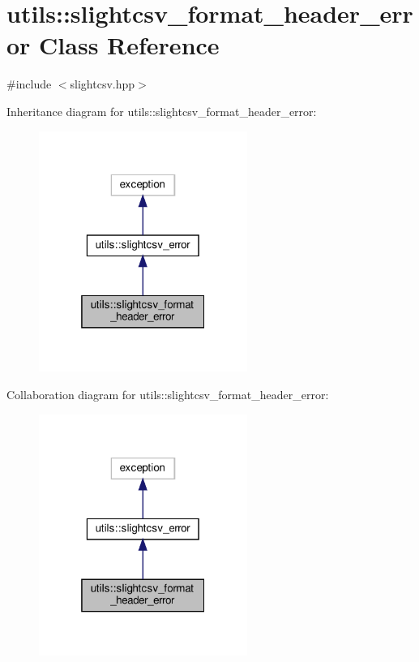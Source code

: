 \hypertarget{classutils_1_1slightcsv__format__header__error}{}\section{utils\+:\+:slightcsv\+\_\+format\+\_\+header\+\_\+error Class Reference}
\label{classutils_1_1slightcsv__format__header__error}


{\ttfamily \#include $<$slightcsv.\+hpp$>$}



Inheritance diagram for utils\+:\+:slightcsv\+\_\+format\+\_\+header\+\_\+error\+:\nopagebreak
\begin{figure}[H]
\begin{center}
\leavevmode
\includegraphics[width=193pt]{classutils_1_1slightcsv__format__header__error__inherit__graph}
\end{center}
\end{figure}


Collaboration diagram for utils\+:\+:slightcsv\+\_\+format\+\_\+header\+\_\+error\+:\nopagebreak
\begin{figure}[H]
\begin{center}
\leavevmode
\includegraphics[width=193pt]{classutils_1_1slightcsv__format__header__error__coll__graph}
\end{center}
\end{figure}


